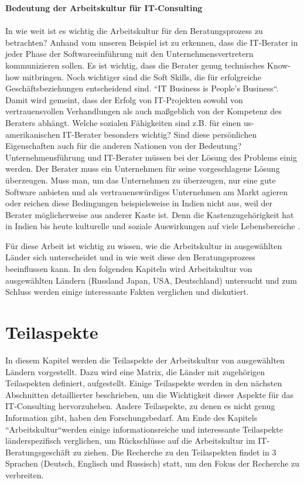 	\textbf{ Bedeutung der Arbeitskultur für IT-Consulting}\\ \\
	In wie weit ist es wichtig die Arbeitskultur für den Beratungsprozess zu betrachten? Anhand vom unseren Beispiel ist zu erkennen, dass die IT-Berater in jeder Phase der Softwareeinführung mit den Unternehmensvertretern kommunizieren sollen. Es ist wichtig, dass die Berater genug technisches Know-how mitbringen. Noch wichtiger sind die Soft Skills, die für erfolgreiche Geschäftsbeziehungen entscheidend sind. ``IT Business is People's Business``. Damit wird gemeint, dass der Erfolg von IT-Projekten sowohl von vertrauensvollen Verhandlungen als auch maßgeblich von der Kompetenz des Beraters abhängt. \cite{ITConsRu}
	Welche sozialen Fähigkeiten sind z.B. für einen us-amerikanischen IT-Berater besonders wichtig? Sind diese persönlichen Eigenschaften auch für die anderen Nationen von der Bedeutung? Unternehmensführung und IT-Berater müssen bei der Lösung des Problems einig werden. Der Berater muss ein Unternehmen für seine vorgeschlagene Lösung überzeugen. Muss man, um das Unternehmen zu überzeugen, nur eine gute Software anbieten und als vertrauenswürdiges Unternehmen am Markt agieren oder reichen diese Bedingungen beispielsweise in Indien nicht aus, weil der Berater möglicherweise aus anderer Kaste ist. Denn die Kastenzugehörigkeit hat in Indien bis heute kulturelle und soziale Auswirkungen auf viele Lebensbereiche \cite{KastensystemInd}.

	Für diese Arbeit ist wichtig zu wissen, wie die Arbeitskultur in ausgewählten Länder sich unterscheidet und in wie weit diese den Beratungsprozess beeinflussen kann.
	In den folgenden Kapiteln wird Arbeitskultur von ausgewählten Ländern (Russland Japan, USA, Deutschland) untersucht und zum Schluss werden einige interessante Fakten verglichen und diskutiert. 
\section{Teilaspekte}
	In diesem Kapitel werden die Teilaspekte der Arbeitskultur von ausgewählten Ländern vorgestellt. Dazu wird eine Matrix, die Länder mit zugehörigen Teilaspekten definiert, aufgestellt. Einige Teilaspekte werden in den nächsten Abschnitten detaillierter beschrieben, um die Wichtigkeit dieser Aspekte für das IT-Consulting hervorzuheben. Andere Teilaspekte, zu denen es nicht genug Information gibt, haben den Forschungsbedarf. Am Ende des Kapitels ``Arbeitskultur``werden einige informationsreiche und interessante Teilaspekte länderspezifisch verglichen, um Rückschlüsse auf die Arbeitskultur im IT-Beratungsgeschäft zu ziehen. 
	Die Recherche zu den Teilaspekten findet in 3 Sprachen (Deutsch, Englisch und Russisch) statt, um den Fokus der Recherche zu verbreiten.
	
